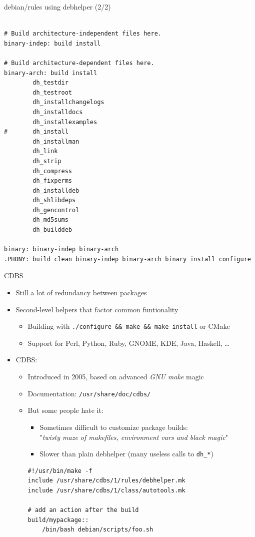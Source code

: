 \documentclass[10pt,final]{beamer}
\begin{document}
\begin{frame}[fragile]{debian/rules using debhelper (2/2)}
\begin{lstlisting}[basicstyle=\ttfamily\footnotesize]

# Build architecture-independent files here.
binary-indep: build install

# Build architecture-dependent files here.
binary-arch: build install
        dh_testdir
        dh_testroot
        dh_installchangelogs 
        dh_installdocs
        dh_installexamples
#       dh_install
        dh_installman
        dh_link
        dh_strip
        dh_compress
        dh_fixperms
        dh_installdeb
        dh_shlibdeps
        dh_gencontrol
        dh_md5sums
        dh_builddeb

binary: binary-indep binary-arch
.PHONY: build clean binary-indep binary-arch binary install configure
\end{lstlisting}
\end{frame}

\begin{frame}[fragile]{CDBS}
\hbr
\begin{itemize}
\item Still a lot of redundancy between packages
\hbr
\item Second-level helpers that factor common funtionality
	\begin{itemize}
	\item Building with \texttt{./configure \&\& make \&\& make install} or CMake
	\item Support for Perl, Python, Ruby, GNOME, KDE, Java, Haskell, \ldots
	\end{itemize}
\hbr
\item CDBS:
	\begin{itemize}
		\item Introduced in 2005, based on advanced \textsl{GNU make} magic
		\item Documentation: \texttt{/usr/share/doc/cdbs/}
		\item But some people hate it:
			\begin{itemize}
				\item Sometimes difficult to customize package builds:\\
				"\textsl{twisty maze of makefiles, environment vars and black magic}"
			\item Slower than plain debhelper (many useless calls to \texttt{dh\_*})
			\end{itemize}
\begin{lstlisting}[basicstyle=\ttfamily\footnotesize]
#!/usr/bin/make -f
include /usr/share/cdbs/1/rules/debhelper.mk
include /usr/share/cdbs/1/class/autotools.mk

# add an action after the build
build/mypackage::
    /bin/bash debian/scripts/foo.sh
\end{lstlisting}
	\end{itemize}
\end{itemize}
\end{frame}
\end{document}

